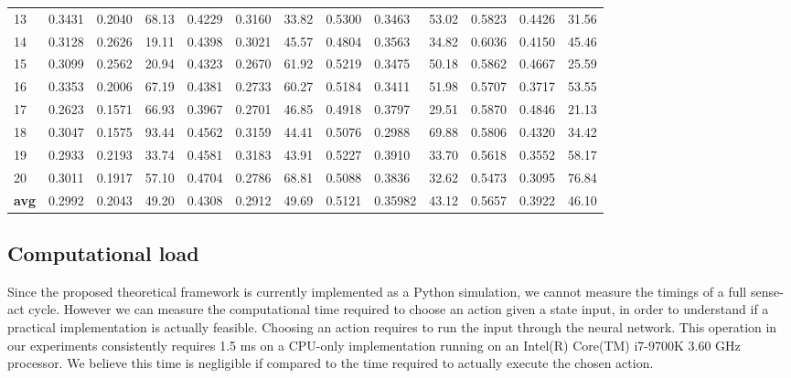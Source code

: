 \documentclass{article}
\begin{document}
\begin{table*}[tb]
\begin{tabular}{l|lll|lll|lll|lll}
			13 &0.3431 & 0.2040 & 68.13 & 0.4229 & 0.3160 & 33.82  & 0.5300 & 0.3463 & 53.02 & 0.5823 & 0.4426 & 31.56 \\
			14 &0.3128 & 0.2626 & 19.11 & 0.4398 & 0.3021 & 45.57  & 0.4804 & 0.3563 & 34.82 & 0.6036 & 0.4150 & 45.46 \\
			15 &0.3099 & 0.2562 & 20.94 & 0.4323 & 0.2670 & 61.92  & 0.5219 & 0.3475 & 50.18 & 0.5862 & 0.4667 & 25.59 \\
			16 &0.3353 & 0.2006 & 67.19 & 0.4381 & 0.2733 & 60.27 & 0.5184 & 0.3411 & 51.98 & 0.5707 & 0.3717 & 53.55 \\
			17 &0.2623 & 0.1571 & 66.93 & 0.3967 & 0.2701 & 46.85  & 0.4918 & 0.3797 & 29.51 & 0.5870 & 0.4846 & 21.13 \\
			18 &0.3047 & 0.1575 & 93.44 & 0.4562 & 0.3159 & 44.41  & 0.5076 & 0.2988 & 69.88 & 0.5806 & 0.4320 & 34.42 \\
			19 &0.2933 & 0.2193 & 33.74 & 0.4581 & 0.3183 & 43.91  & 0.5227 & 0.3910 & 33.70 & 0.5618 & 0.3552 & 58.17 \\
			20 &0.3011 & 0.1917 & 57.10 & 0.4704 & 0.2786 & 68.81 & 0.5088 & 0.3836 & 32.62 & 0.5473 & 0.3095 & 76.84 \\ \midrule
			\textbf{avg} &0.2992 &	0.2043 & 49.20 & 0.4308 & 0.2912 & 49.69 & 0.5121 & 0.35982 & 43.12 & 0.5657 & 0.3922 & 46.10 \\  %
	\end{tabular}
\end{table*}

\subsection{Computational load}
Since the proposed theoretical framework is currently implemented as a Python simulation, we cannot measure the timings of a full sense-act cycle. However we can measure the computational time required to choose an action given a state input, in order to understand if a practical implementation is actually feasible. Choosing an action requires to run the input through the neural network. This operation in our experiments consistently requires 1.5 ms on a CPU-only implementation running on an Intel(R) Core(TM) i7-9700K 3.60 GHz processor. We believe this time is negligible if compared to the time required to actually execute the chosen action.



\end{document}
